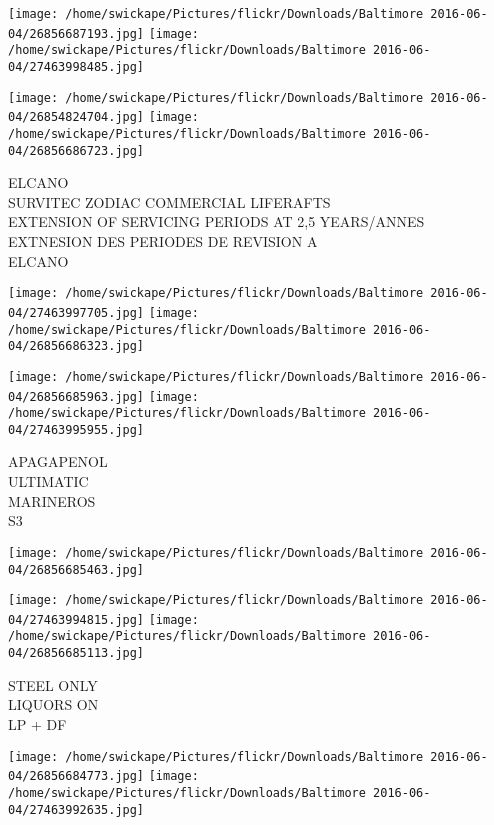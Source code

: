 \documentclass[10pt,letterpaper]{article}
\begin{document}
\texttt{[image: /home/swickape/Pictures/flickr/Downloads/Baltimore 2016-06-04/26856687193.jpg]}
\texttt{[image: /home/swickape/Pictures/flickr/Downloads/Baltimore 2016-06-04/27463998485.jpg]}

\texttt{[image: /home/swickape/Pictures/flickr/Downloads/Baltimore 2016-06-04/26854824704.jpg]}
\texttt{[image: /home/swickape/Pictures/flickr/Downloads/Baltimore 2016-06-04/26856686723.jpg]}

ELCANO\\
SURVITEC ZODIAC COMMERCIAL LIFERAFTS\\
EXTENSION OF SERVICING PERIODS AT 2,5 YEARS/ANNES EXTNESION DES PERIODES DE REVISION A\\
ELCANO\\
\pagebreak

\texttt{[image: /home/swickape/Pictures/flickr/Downloads/Baltimore 2016-06-04/27463997705.jpg]}
\texttt{[image: /home/swickape/Pictures/flickr/Downloads/Baltimore 2016-06-04/26856686323.jpg]}

\texttt{[image: /home/swickape/Pictures/flickr/Downloads/Baltimore 2016-06-04/26856685963.jpg]}
\texttt{[image: /home/swickape/Pictures/flickr/Downloads/Baltimore 2016-06-04/27463995955.jpg]}

APAGAPENOL\\
ULTIMATIC\\
MARINEROS\\
S3\\
\pagebreak

\texttt{[image: /home/swickape/Pictures/flickr/Downloads/Baltimore 2016-06-04/26856685463.jpg]}

\vspace{0.25in}
\texttt{[image: /home/swickape/Pictures/flickr/Downloads/Baltimore 2016-06-04/27463994815.jpg]}
\texttt{[image: /home/swickape/Pictures/flickr/Downloads/Baltimore 2016-06-04/26856685113.jpg]}

STEEL ONLY\\
LIQUORS ON\\
LP + DF\\
\pagebreak

\texttt{[image: /home/swickape/Pictures/flickr/Downloads/Baltimore 2016-06-04/26856684773.jpg]}
\texttt{[image: /home/swickape/Pictures/flickr/Downloads/Baltimore 2016-06-04/27463992635.jpg]}
\end{document}

